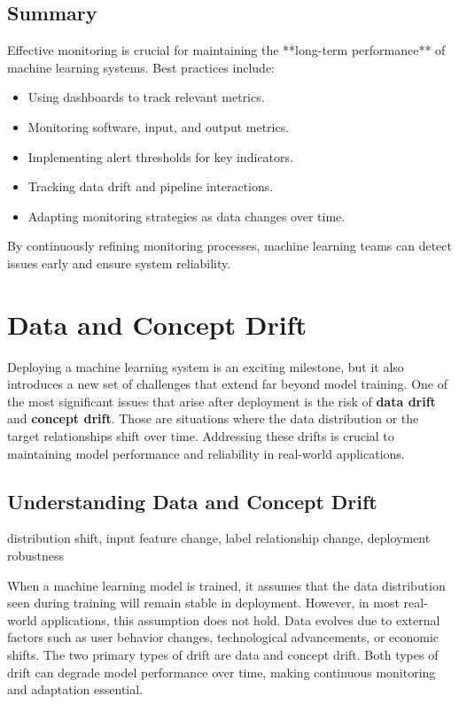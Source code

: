 \documentclass[12pt,openany, draft]{book}
\begin{document}
\section{Summary}

Effective monitoring is crucial for maintaining the **long-term performance** of machine learning systems. Best practices include:

\begin{itemize}
    \item Using dashboards to track relevant metrics.
    \item Monitoring software, input, and output metrics.
    \item Implementing alert thresholds for key indicators.
    \item Tracking data drift and pipeline interactions.
    \item Adapting monitoring strategies as data changes over time.
\end{itemize}

By continuously refining monitoring processes, machine learning teams can detect issues early and ensure system reliability.




\chapter{Data and Concept Drift}

Deploying a machine learning system is an exciting milestone, but it also introduces a new set of challenges that extend far beyond model training. One of the most significant issues that arise after deployment is the risk of \textbf{data drift} and \textbf{concept drift}. Those are situations where the data distribution or the target relationships shift over time. Addressing these drifts is crucial to maintaining model performance and reliability in real-world applications.



\section{Understanding Data and Concept Drift}

\begin{keywordsbox}
distribution shift, input feature change, label relationship change, deployment robustness
\end{keywordsbox}

When a machine learning model is trained, it assumes that the data distribution seen during training will remain stable in deployment. However, in most real-world applications, this assumption does not hold. Data evolves due to external factors such as user behavior changes, technological advancements, or economic shifts. The two primary types of drift are data and concept drift. Both types of drift can degrade model performance over time, making continuous monitoring and adaptation essential.
\end{document}
